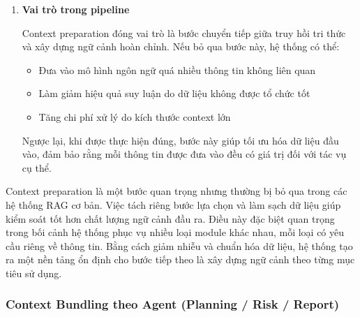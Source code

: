 \begin{enumerate}
    Một bước quan trọng là chuẩn hóa dữ liệu về một cấu trúc thống nhất trước khi chuyển sang giai đoạn xây dựng ngữ cảnh. Thay vì giữ nguyên toàn bộ nội dung tài liệu, hệ thống chỉ giữ lại các trường cần thiết, ví dụ:
    \begin{itemize}
        \item Định danh (\texttt{check\_id})
        \item Service liên quan
        \item Tiêu đề
        \item Mô tả, rủi ro và hướng khắc phục (nếu có)
    \end{itemize}

    Cách tiếp cận này giúp giảm độ phức tạp của dữ liệu đầu vào, đảm bảo tính nhất quán giữa các tài liệu và tạo điều kiện thuận lợi cho việc xây dựng prompt ở bước sau.

    \item \textbf{Vai trò trong pipeline}

    Context preparation đóng vai trò là bước chuyển tiếp giữa truy hồi tri thức và xây dựng ngữ cảnh hoàn chỉnh. Nếu bỏ qua bước này, hệ thống có thể:
    \begin{itemize}
        \item Đưa vào mô hình ngôn ngữ quá nhiều thông tin không liên quan
        \item Làm giảm hiệu quả suy luận do dữ liệu không được tổ chức tốt
        \item Tăng chi phí xử lý do kích thước context lớn
    \end{itemize}

    Ngược lại, khi được thực hiện đúng, bước này giúp tối ưu hóa dữ liệu đầu vào, đảm bảo rằng mỗi thông tin được đưa vào đều có giá trị đối với tác vụ cụ thể.

\end{enumerate}

Context preparation là một bước quan trọng nhưng thường bị bỏ qua trong các hệ thống RAG cơ bản. Việc tách riêng bước lựa chọn và làm sạch dữ liệu giúp kiểm soát tốt hơn chất lượng ngữ cảnh đầu ra. Điều này đặc biệt quan trọng trong bối cảnh hệ thống phục vụ nhiều loại module khác nhau, mỗi loại có yêu cầu riêng về thông tin. Bằng cách giảm nhiễu và chuẩn hóa dữ liệu, hệ thống tạo ra một nền tảng ổn định cho bước tiếp theo là xây dựng ngữ cảnh theo từng mục tiêu sử dụng.



\subsubsection*{Context Bundling theo Agent (Planning / Risk / Report)}

